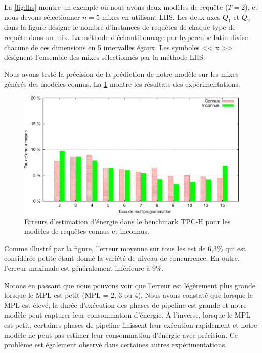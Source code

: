 La \ref{fig:lhs} montre un exemple où nous avons deux modèles de requête ($T = 2$), et nous devons sélectionner $n = 5$ mixes en utilisant LHS. Les deux axes $Q_1$ et $Q_2$ dans la figure désigne le nombre d'instances de requêtes de chaque type de requête dans un mix. La méthode d'échantillonnage par hypercube latin divise chacune de ces dimensions en 5 intervalles égaux. Les symboles << x >> désignent l'ensemble des mixes sélectionnés par la méthode LHS.

Nous avons testé la précision de la prédiction de notre modèle sur les mixes générés des modèles connus. La \ref{fig:tpch-test-all} montre les résultats des expérimentations.

\begin{figure}
 \centering
 \includegraphics[scale=0.6]{chapitre4/chap4Fig/tpch-test-all.eps}
 \caption{Erreurs d'estimation d'énergie dans le benchmark TPC-H pour les modèles de requêtes connus et inconnus.}
 \label{fig:tpch-test-all}
\end{figure}

Comme illustré par la figure, l'erreur moyenne sur tous les est de 6,3\%  qui est considérée petite étant donné la variété de niveau de concurrence. En outre, l'erreur maximale est généralement inférieure à 9\%.

Notons en passant que nous pouvons voir que l'erreur est légèrement plus grande lorsque le MPL est petit (MPL = 2, 3 ou 4). Nous avons constaté que lorsque le MPL est élevé, la durée d'exécution des phases de pipeline est grande et notre modèle peut capturer leur consommation d'énergie. \`A l'inverse, lorsque le MPL est petit,  certaines phases de pipeline finissent leur exécution rapidement et notre modèle ne peut pas estimer leur consommation d'énergie avec précision. Ce problème est également observé dans certaines autres expérimentations.

